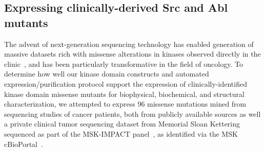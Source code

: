 \documentclass[9pt,lineno]{elife}
\begin{document}
\subsection{Expressing clinically-derived Src and Abl mutants}

The advent of next-generation sequencing technology has enabled generation of massive datasets rich with missense alterations in kinases observed directly in the clinic~\citep{Varghese:2014jw,Zehir:2017ib,Garraway:2013kn}, and has been particularly transformative in the field of oncology. 
To determine how well our kinase domain constructs and automated expression/purification protocol support the expression of clinically-identified kinase domain missense mutants for biophysical, biochemical, and structural characterization, we attempted to express 96 missense mutations mined from sequencing studies of cancer patients, both from publicly available sources as well a private clinical tumor sequencing dataset from Memorial Sloan Kettering~\citep{Zehir:2017ib} sequenced as part of the MSK-IMPACT panel~\citep{msk-impact}, as identified via the MSK cBioPortal~\citep{cBioPortal}. 
\end{document}
